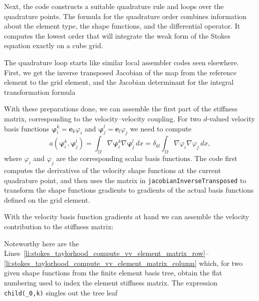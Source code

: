 \documentclass[a4paper,10pt,headings=normal,bibliography=totoc]{scrartcl}
\newcommand{\cpp}[1]{\lstinline[basicstyle=\ttfamily]!#1!}
\begin{document}
Next, the code constructs a suitable quadrature rule and loops over the quadrature points.  The formula for the quadrature
order combines information about the element type, the shape functions, and the differential operator.
It computes the lowest order that will integrate the weak form of the Stokes equation exactly
on a cube grid.
%

%
The quadrature loop starts like similar local assembler codes seen elsewhere.
First, we get the inverse transposed Jacobian
of the map from the reference element to the grid element, and the Jacobian determinant for the integral
transformation formula
%

%
With these preparations done, we can assemble the first part of the stiffness matrix,  corresponding to the
velocity--velocity coupling.  For two $d$-valued velocity basis functions $\bm{\varphi}_i^k = \mathbf{e}_k \varphi_i$
and $\bm{\varphi}_j^l = \mathbf{e}_l \varphi_j$ we need to compute
\begin{equation*}
 a(\bm{\varphi}_i^k, \bm{\varphi}_j^l)
 =
 \int_\Omega \nabla \bm{\varphi}_i^k \nabla \bm{\varphi}_j^l \,dx
 =
 \delta_{kl} \int_\Omega \nabla \varphi_i \nabla \varphi_j \,dx,
\end{equation*}
where $\varphi_i$ and $\varphi_j$ are the corresponding scalar basis functions.
The code first computes the derivatives of the velocity
shape functions at the current quadrature point,
and then uses the matrix in \cpp{jacobianInverseTransposed} to transform the shape functions gradients to
gradients of the actual basis functions defined on the grid element.
%

%
With the velocity basis function gradients at hand we can assemble the velocity contribution
to the stiffness matrix:
%

%
Noteworthy here are the Lines~\ref{li:stokes_taylorhood_compute_vv_element_matrix_row}--\ref{li:stokes_taylorhood_compute_vv_element_matrix_column} which,
for two given shape functions from the finite element basis tree, obtain the flat numbering
used to index the element stiffness matrix.  The expression \cpp{child(_0,k)} singles out the tree leaf
\end{document}
